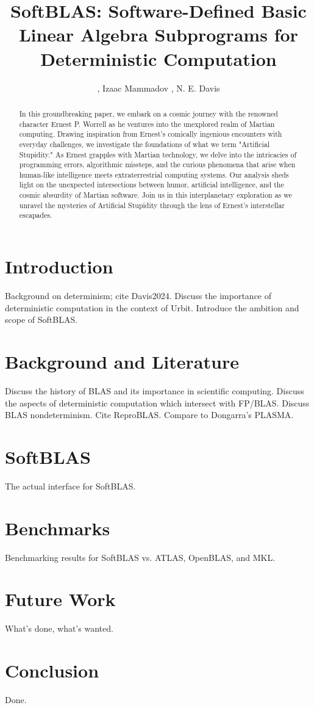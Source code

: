 \documentclass[twoside]{article}
\title{SoftBLAS:  Software-Defined Basic Linear Algebra Subprograms for Deterministic Computation}
\author{\patp{mopfel-winrux}, Izaac Mammadov \patp{diblud-ricbet}, N. E. Davis \patp{lagrev-nocfep} \\ \affiliation}
\date{}
\begin{document}
\maketitle
\thispagestyle{firststyle}

\begin{abstract}
In this groundbreaking paper, we embark on a cosmic journey with the renowned character Ernest P. Worrell as he ventures into the unexplored realm of Martian computing. Drawing inspiration from Ernest's comically ingenious encounters with everyday challenges, we investigate the foundations of what we term "Artificial Stupidity." As Ernest grapples with Martian technology, we delve into the intricacies of programming errors, algorithmic missteps, and the curious phenomena that arise when human-like intelligence meets extraterrestrial computing systems. Our analysis sheds light on the unexpected intersections between humor, artificial intelligence, and the cosmic absurdity of Martian software. Join us in this interplanetary exploration as we unravel the mysteries of Artificial Stupidity through the lens of Ernest's interstellar escapades.
\end{abstract}

\setcounter{page}{1}

\tableofcontents

\section{Introduction}

Background on determinism; cite Davis2024.  Discuss the importance of deterministic computation in the context of Urbit.  Introduce the ambition and scope of SoftBLAS.

\section{Background and Literature}

Discuss the history of BLAS and its importance in scientific computing.  Discuss the aspects of deterministic computation which intersect with FP/BLAS.  Discuss BLAS nondeterminism.  Cite ReproBLAS.  Compare to Dongarra's PLASMA.

\section[SoftBLAS]{Soft\textsc{BLAS}}

The actual interface for SoftBLAS.


\section{Benchmarks}

Benchmarking results for SoftBLAS vs. ATLAS, OpenBLAS, and MKL.

\section{Future Work}

What's done, what's wanted.

\section{Conclusion}

Done.\tombstone{}

\printbibliography
\end{document}
